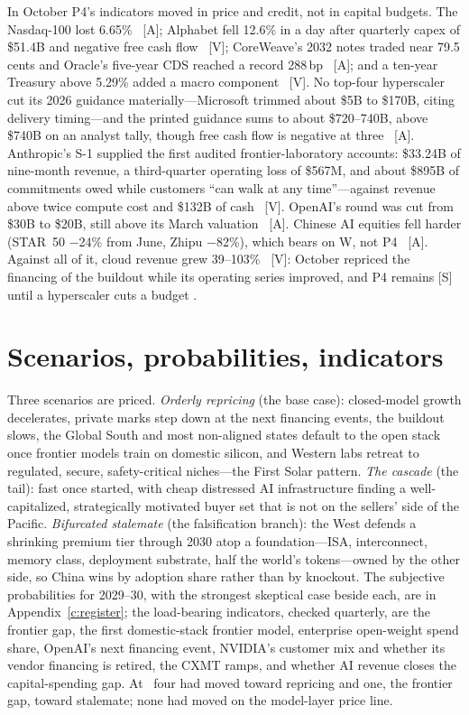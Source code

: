 In October P4's indicators moved in price and credit, not in capital budgets. The Nasdaq-100 lost 6.65\%~\cite{cap-nasdaq-oct} [A]; Alphabet fell 12.6\% in a day after quarterly capex of \$51.4B and negative free cash flow~\cite{cap-alphabet-q3} [V]; CoreWeave's 2032 notes traded near 79.5 cents and Oracle's five-year CDS reached a record 288\,bp~\cite{cap-coreweave-oct,cap-oracle-cds-oct} [A]; and a ten-year Treasury above 5.29\% added a macro component~\cite{cap-treasury-sep} [V]. No top-four hyperscaler cut its 2026 guidance materially---Microsoft trimmed about \$5B to \$170B, citing delivery timing---and the printed guidance sums to about \$720--740B, above \$740B on an analyst tally, though free cash flow is negative at three~\cite{cap-capex-tally} [A]. Anthropic's S-1 supplied the first audited frontier-laboratory accounts: \$33.24B of nine-month revenue, a third-quarter operating loss of \$567M, and about \$895B of commitments owed while customers ``can walk at any time''---against revenue above twice compute cost and \$132B of cash~\cite{cap-anthropic-s1} [V]. OpenAI's round was cut from \$30B to \$20B, still above its March valuation~\cite{cap-openai-round} [A]. Chinese AI equities fell harder (STAR~50 $-$24\% from June, Zhipu $-$82\%), which bears on W, not P4~\cite{cap-china-ai-equities} [A]. Against all of it, cloud revenue grew 39--103\%~\cite{cap-alphabet-q3,cap-amazon-q3} [V]: October repriced the financing of the buildout while its operating series improved, and P4 remains [S] until a hyperscaler cuts a budget .

\section{Scenarios, probabilities, indicators}

Three scenarios are priced. \emph{Orderly repricing} (the base case): closed-model growth decelerates, private marks step down at the next financing events, the buildout slows, the Global South and most non-aligned states default to the open stack once frontier models train on domestic silicon, and Western labs retreat to regulated, secure, safety-critical niches---the First Solar pattern. \emph{The cascade} (the tail): fast once started, with cheap distressed AI infrastructure finding a well-capitalized, strategically motivated buyer set that is not on the sellers' side of the Pacific. \emph{Bifurcated stalemate} (the falsification branch): the West defends a shrinking premium tier through 2030 atop a foundation---ISA, interconnect, memory class, deployment substrate, half the world's tokens---owned by the other side, so China wins by adoption share rather than by knockout. The subjective probabilities for 2029--30, with the strongest skeptical case beside each, are in Appendix~\ref{c:register}; the load-bearing indicators, checked quarterly, are the frontier gap, the first domestic-stack frontier model, enterprise open-weight spend share, OpenAI's next financing event, NVIDIA's customer mix and whether its vendor financing is retired, the CXMT ramps, and whether AI revenue closes the capital-spending gap. At \datafreeze\ four had moved toward repricing and one, the frontier gap, toward stalemate; none had moved on the model-layer price line.

